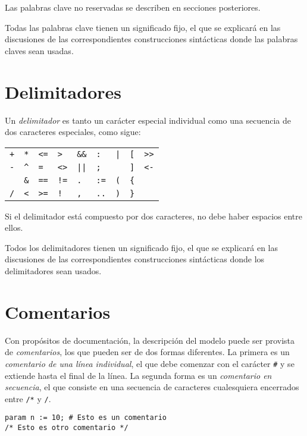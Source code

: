 \documentclass[11pt,spanish]{report}
\def\para#1{\noindent{\bf#1}}
\begin{document}
Las palabras clave no reservadas se describen en secciones posteriores.

Todas las palabras clave tienen un significado fijo, el que se explicará en las discusiones de las correspondientes construcciones sintácticas donde las palabras claves sean usadas.

\section{Delimitadores}

Un {\it delimitador} es tanto un carácter especial individual como una secuencia de dos caracteres especiales, como sigue:

\noindent\hfil
\begin{tabular}{@{}p{.3in}p{.3in}p{.3in}p{.3in}p{.3in}p{.3in}p{.3in}
p{.3in}p{.3in}@{}}
{\tt+}&{\tt**}&{\tt<=}&{\tt>}&{\tt\&\&}&{\tt:}&{\tt|}&{\tt[}&{\tt>}{\tt>}\\
{\tt-}&{\tt\textasciicircum}&{\tt=}&{\tt<>}&{\tt||}&{\tt;}&{\tt\char126}
&{\tt]}&{\tt<-}\\
{\tt*}&{\tt\&}&{\tt==}&{\tt!=}&{\tt.}&{\tt:=}&{\tt(}&{\tt\{}\\
{\tt/}&{\tt<}&{\tt>=}&{\tt!}&{\tt,}&{\tt..}&{\tt)}&{\tt\}}\\
\end{tabular}

Si el delimitador está compuesto por dos caracteres, no debe haber espacios entre ellos.

Todos los delimitadores tienen un significado fijo, el que se explicará en las discusiones de las correspondientes construcciones sintácticas donde los delimitadores sean usados.

\section{Comentarios}

Con propósitos de documentación, la descripción del modelo puede ser provista de {\it comentarios}, los que pueden ser de dos formas diferentes. La primera es un {\it comentario de una línea individual}, el que debe comenzar con el carácter {\tt\#} y se extiende hasta el final de la línea. La segunda forma es un {\it comentario en secuencia}, el que consiste en una secuencia de caracteres cualesquiera encerrados entre {\tt/*} y {\tt*/}.

\para{Ejemplos}

\begin{verbatim}
param n := 10; # Esto es un comentario
/* Esto es otro comentario */
\end{verbatim}
\end{document}
